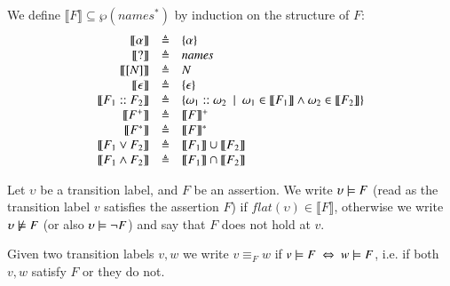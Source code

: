 \begin{definition}
 We define $\llbracket F\rrbracket \subseteq\wp(\mathit{names}^*)$ by induction on the structure of $F$: 
\[
\begin{array}{rcl}
 \llbracket \alpha \rrbracket &\triangleq&  \{\alpha\} \\
 \llbracket ? \rrbracket &\triangleq&   \mathit{names}\\
 \llbracket [N]\rrbracket &\triangleq&   N\\
 \llbracket \epsilon \rrbracket &\triangleq&  \{\epsilon\} \\
 \llbracket F_1::F_2 \rrbracket &\triangleq& \{\omega_1 :: \omega_2~\mid~ \omega_1 \in \llbracket F_1 \rrbracket \wedge \omega_2 \in \llbracket F_2 \rrbracket\}  \\
 \llbracket F^+ \rrbracket &\triangleq& \llbracket F \rrbracket^+  \\
 \llbracket F^* \rrbracket &\triangleq& \llbracket F \rrbracket^*  \\
 \llbracket  F_1 \vee F_2 \rrbracket &\triangleq& \llbracket  F_1\rrbracket \cup \llbracket  F_2\rrbracket  \\
 \llbracket  F_1 \wedge F_2 \rrbracket &\triangleq& \llbracket F_1 \rrbracket \cap \llbracket F_2\rrbracket 
\end{array}
\]
\end{definition}




\begin{definition}\label{sec:semantics}
Let  $\upsilon$ be  a transition label, and $F$ be an assertion.
We write $\upsilon \models F$ (read as the transition label $v$ satisfies the assertion $F$) 
if $\mathit{flat}(\upsilon)\in \llbracket F\rrbracket$, otherwise we write $\upsilon \not\models F$ (or also $\upsilon \models \neg F$) and say that $F$ does not hold at $v$. 
\end{definition}

Given two transition labels $v,w$ we write $v\equiv_F w$ if $v \models F\ \Leftrightarrow\ w \models F$, i.e. if both $v,w$ satisfy $F$ or they do not.

